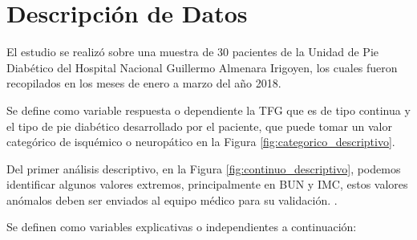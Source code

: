 \documentclass[runningheads,a4paper]{llncs}
\begin{document}
\section{Descripción de Datos}

El estudio se realizó sobre una muestra de 30 pacientes de la Unidad de Pie Diabético del Hospital Nacional Guillermo Almenara Irigoyen, los cuales fueron recopilados en los meses de enero a marzo del año 2018.

Se define como variable respuesta o dependiente la \ac{TFG} que es de tipo continua y el tipo de pie diabético desarrollado por el paciente, que puede tomar un valor categórico de isquémico o neuropático en la Figura
\ref{fig:categorico_descriptivo}.  

Del primer análisis descriptivo, en la Figura \ref{fig:continuo_descriptivo}, podemos identificar algunos valores extremos, principalmente en BUN y IMC, estos valores anómalos deben ser enviados al equipo médico para su validación. .

Se definen como variables explicativas o independientes a continuación: 
\end{document}
